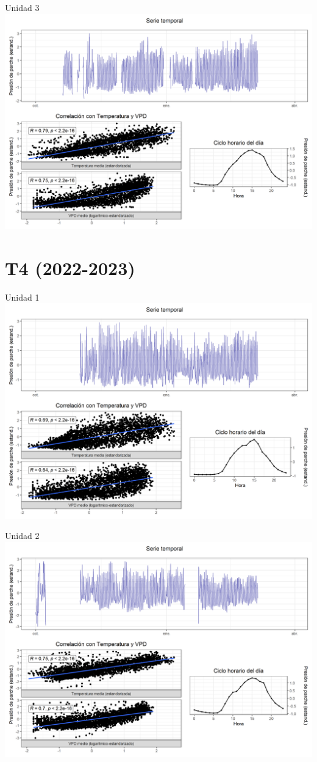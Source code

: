 \documentclass[
  letterpaper,
  DIV=11,
  numbers=noendperiod]{scrreprt}
\begin{document}
Unidad 3
\includegraphics{figuras/04_turgor_unidad/2022_2023_La_Esperanza_T3_Unidad_3.png}

\chapter{T4 (2022-2023)}

Unidad 1
\includegraphics{figuras/04_turgor_unidad/2022_2023_La_Esperanza_T4_Unidad_1.png}

Unidad 2
\includegraphics{figuras/04_turgor_unidad/2022_2023_La_Esperanza_T4_Unidad_2.png}
\end{document}
